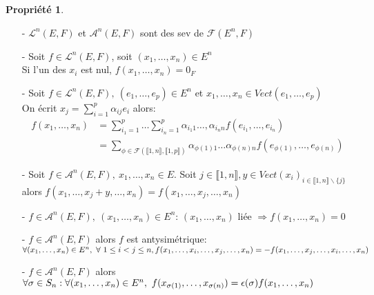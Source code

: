 \documentclass[fleqn]{article}
\theoremstyle{definition} \newtheorem*{defi}{D\'efinition}
\theoremstyle{definition} \newtheorem*{theo}{Th\'eor\`eme}
\theoremstyle{definition} \newtheorem*{coro}{Corollaire}
\theoremstyle{definition} \newtheorem*{nota}{Notation}
\theoremstyle{definition} \newtheorem*{vocab}{Vocabulaire}
\theoremstyle{remark} \newtheorem*{rqs}{Remarques}
\theoremstyle{definition} \newtheorem*{prop}{Propri\'et\'e}
\begin{document}
\begin{prop} $ $
	\begin{itemize}
		\item [-] $\mathscr{L}^n(E,F)$ et $\mathscr{A}^n(E,F)$ sont des sev de $\mathscr{F}(E^n,F)$
		\item [-] Soit $f \in \mathscr{L}^n(E,F)$, soit $(x_1, \hdots, x_n) \in E^n$\\Si l'un des $x_i$ est nul,
			\mbox{$f(x_1, \hdots, x_n) = 0_F$}
		\item [-] Soit $f \in \mathscr{L}^n(E,F),\ (e_1, \hdots, e_p) \in E^n$ et $x_1, \hdots, x_n \in Vect(e_1, \hdots, e_p)$\\On \'ecrit
			$x_j = \sum_{i=1}^p \alpha_{ij} e_i$ alors:
			\begin{align*}
				f(x_1, \hdots, x_n) &= \sum_{i_1 = 1}^p \hdots \sum_{i_n = 1}^p \alpha_{i_1 1} \hdots, \alpha_{i_n n}
					f(e_{i_1}, \hdots, e_{i_n})\\
									&= \sum_{\phi \in \mathscr{F}(\llbracket 1,n \rrbracket , \llbracket 1,p \rrbracket )} \alpha_{\phi(1) 1} \hdots \alpha_{\phi(n) n}
					f(e_{\phi(1)}, \hdots, e_{\phi(n)})
			\end{align*}
		\item [-] Soit $f \in \mathscr{A}^n(E,F),\ x_1, \hdots, x_n \in E$. Soit $j \in \llbracket 1,n \rrbracket , y \in Vect(x_i)_{i \in \llbracket 1,n \rrbracket
			\backslash \{j\}}$ alors $f(x_1, \hdots, x_j + y, \hdots, x_n) = f(x_1, \hdots, x_j, \hdots, x_n)$
		\item [-] $f \in \mathscr{A}^n(E,F),\ (x_1, \hdots, x_n) \in E^n$: $(x_1, \hdots, x_n)$ li\'ee $\Rightarrow f(x_1, \hdots, x_n) = 0$
		\item [-] $f \in \mathscr{A}^n(E,F)$ alors $f$ est antysim\'etrique: \\
			$\forall (x_1, \hdots, x_n) \in E^n,\ \forall\ 1 \leq i < j \leq n,\\
			f(x_1, \hdots, x_i, \hdots, x_j, \hdots, x_n) = -f(x_1, \hdots, x_j, \hdots, x_i, \hdots, x_n)$
		\item [-] $f \in \mathscr{A}^n(E,F)$ alors $\forall \sigma \in S_n:\\ \forall (x_1, \hdots, x_n) \in E^n,\ f(x_{\sigma(1)}, \hdots,
			x_{\sigma(n)}) = \epsilon(\sigma)f(x_1, \hdots, x_n)$
	\end{itemize}
\end{prop}
\end{document}
